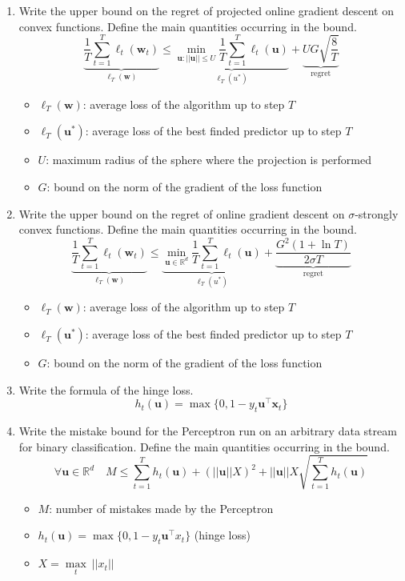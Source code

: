\documentclass[a4paper]{article}
\newcommand{\RN}{\ensuremath{\mathbb{R}}}
\begin{document}
\begin{enumerate}
    \item Write the upper bound on the regret of projected online gradient descent on
    convex functions. Define the main quantities occurring in the bound.
    $$\underbrace{\frac{1}{T}\sum_{t=1}^{T}\ell_t(\bm w_t)}_{\ell_T(\bm w)}\leq 
    \underbrace{\min_{\bm u: ||\bm{u}||\leq U}
    {\frac{1}{T}\sum_{t=1}^T \ell_t(\bm u)}}_{\ell_T(u^*)}+
    \underbrace{UG\sqrt{\frac{8}{T}}}_{\text{regret}}$$
    \begin{itemize}
        \item $\ell_T(\bm w)$: average loss of the algorithm up to step $T$
        \item $\ell_T(\bm u^*)$: average loss of the best finded predictor up to step $T$
        \item $U$: maximum radius of the sphere where the projection is performed
        \item $G$: bound on the norm of the gradient of the loss function
    \end{itemize}
    \item Write the upper bound on the regret of online gradient descent on $\sigma$-strongly
    convex functions. Define the main quantities occurring in the bound.
    $$\underbrace{\frac{1}{T}\sum_{t=1}^{T}\ell_t(\bm w_t)}_{\ell_T(\bm w)}\leq 
    \underbrace{\min_{\bm u\in\RN^d}
    {\frac{1}{T}\sum_{t=1}^T \ell_t(\bm u)}}_{\ell_T(u^*)}+
    \underbrace{\frac{G^2(1+\ln{T})}{2\sigma T}}_{\text{regret}}$$
    \begin{itemize}
        \item $\ell_T(\bm w)$: average loss of the algorithm up to step $T$
        \item $\ell_T(\bm u^*)$: average loss of the best finded predictor up to step $T$
        \item $G$: bound on the norm of the gradient of the loss function
    \end{itemize}
    \item Write the formula of the hinge loss.
    $$ h_t(\bm u) = \max{\{0,1-y_t\bm u^\top \bm x_t\}} $$
    \item Write the mistake bound for the Perceptron run on an arbitrary data stream for 
    binary classification. Define the main quantities occurring in the bound.
    $$ \forall \bm u\in\RN^d \quad 
    M\leq\sum_{t=1}^{T}h_t(\bm u)+(||\bm u||X)^2
    +||\bm u||X\sqrt{\sum_{t=1}^{T}h_t(\bm u)} $$
    \begin{itemize}
        \item $M$: number of mistakes made by the Perceptron
        \item $h_t(\bm u) = \max{\{0,1-y_t\bm u^\top x_t\}}$ (hinge loss)
        \item $X = \underset{t}{\max}\ ||x_t||$
    \end{itemize}
\end{enumerate}
\end{document}
